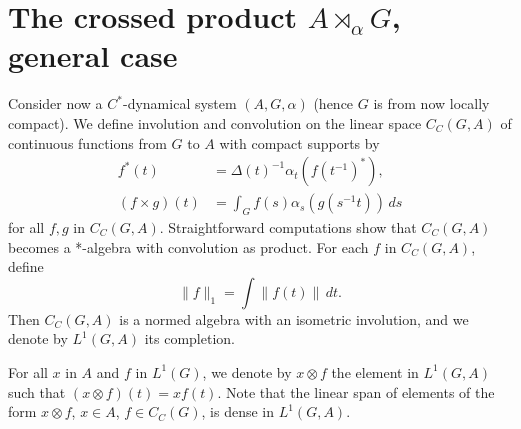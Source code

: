 \documentclass{book}
\begin{document}
\section{The crossed product \texorpdfstring{\(A\rtimes_\alpha G\)}{Ax alpha G}, general case}
Consider now a \(C^*\)-dynamical system \((A,G,\alpha)\) (hence \(G\) is from now locally compact).
We define involution and convolution on the linear space \(C_C(G,A)\) of continuous functions from \(G\) to \(A\) with compact supports by
\begin{align*}
  f^*(t)&={\Delta(t)}^{-1}\alpha_t({f(t^{-1})}^*),\\
  (f\times g)(t)&=\int_G f(s)\alpha_s(g(s^{-1}t))\,ds
\end{align*}
for all \(f,g\) in \(C_C(G,A)\). Straightforward computations show that \(C_C(G,A)\) becomes a *-algebra with convolution
as product. For each \(f\) in \(C_C(G,A)\), define
\[
  \|f\|_1=\int\|f(t)\|\,dt.
\]
Then \(C_C(G,A)\) is a normed algebra with an isometric involution, and we denote by \(L^1(G,A)\) its completion.\par
For all \(x\) in \(A\) and \(f\) in \(L^1(G)\), we denote by \(x\otimes f\) the element in \(L^1(G,A)\) such that
\((x\otimes f)(t)=xf(t)\). Note that the linear span of elements of the form \(x\otimes f\), \(x\in A\), \(f\in C_C(G)\), is dense in \(L^1(G,A)\).\par
\end{document}
